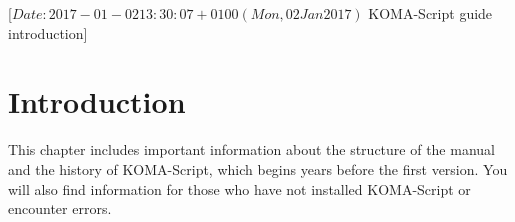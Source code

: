 %
%
%
%
%
%
%
%
% 
%
%
%
%

                 [$Date: 2017-01-02 13:30:07 +0100 (Mon, 02 Jan 2017) $
                  KOMA-Script guide introduction]


\chapter{Introduction}

This chapter includes important information about the structure of the manual
and the history of KOMA-Script, which begins years before the first
version. You will also find information for those who have not installed
KOMA-Script or encounter errors.


